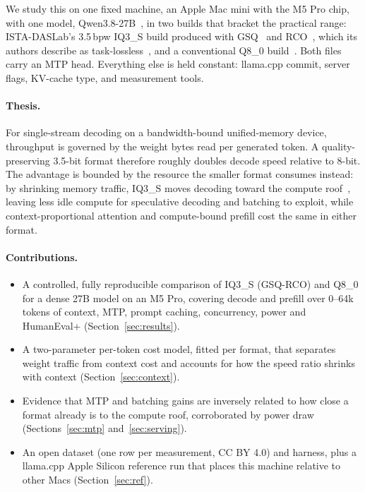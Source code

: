 \documentclass[11pt]{article}
\begin{document}
We study this on one fixed machine, an Apple Mac mini with the M5 Pro chip, with one model,
Qwen3.8-27B~\cite{qwen38card,qwen2025qwen3}, in two builds that bracket the practical range:
ISTA-DASLab's 3.5\,bpw IQ3\_S build produced with GSQ~\cite{dadgarnia2026gsq} and
RCO~\cite{helcig2026rco}, which its authors describe as task-lossless~\cite{istagguf}, and a
conventional Q8\_0 build~\cite{unslothgguf}. Both files carry an MTP head. Everything else
is held constant: llama.cpp commit, server flags, KV-cache type, and measurement tools.

\paragraph{Thesis.} For single-stream decoding on a bandwidth-bound unified-memory device,
throughput is governed by the weight bytes read per generated token. A quality-preserving
3.5-bit format therefore roughly doubles decode speed relative to 8-bit. The advantage is
bounded by the resource the smaller format consumes instead: by shrinking memory traffic,
IQ3\_S moves decoding toward the compute roof~\cite{williams2009roofline}, leaving less idle
compute for speculative decoding and batching to exploit, while context-proportional
attention and compute-bound prefill cost the same in either format.

\paragraph{Contributions.}
\begin{itemize}
  \item A controlled, fully reproducible comparison of IQ3\_S (GSQ-RCO) and Q8\_0 for a dense
        27B model on an M5 Pro, covering decode and prefill over 0--64k tokens of context, MTP,
        prompt caching, concurrency, power and HumanEval+ (Section~\ref{sec:results}).
  \item A two-parameter per-token cost model, fitted per format, that separates weight
        traffic from context cost and accounts for how the speed ratio shrinks with context
        (Section~\ref{sec:context}).
  \item Evidence that MTP and batching gains are inversely related to how close a format
        already is to the compute roof, corroborated by power draw (Sections~\ref{sec:mtp}
        and~\ref{sec:serving}).
  \item An open dataset (one row per measurement, CC BY 4.0) and harness, plus a llama.cpp
        Apple Silicon reference run that places this machine relative to other Macs
        (Section~\ref{sec:ref}).
\end{itemize}
\end{document}
